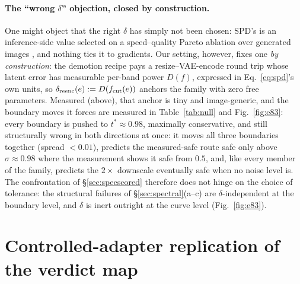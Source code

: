 \paragraph{The ``wrong $\delta$'' objection, closed by construction.}
One might object that the right $\delta$ has simply not been chosen:
SPD's is an inference-side value selected on a speed--quality Pareto
ablation over generated images \citep{xiao2026spd}, and nothing ties it
to gradients. Our setting, however, fixes one \emph{by construction}:
the demotion recipe pays a resize--VAE-encode round trip whose latent
error has measurable per-band power $D(f)$, expressed in
Eq.~\ref{eq:spd}'s own units, so $\delta_{\mathrm{reenc}}(e) :=
D(f_{\mathrm{cut}}(e))$ anchors the family with zero free parameters.
Measured (above), that anchor is tiny and image-generic, and the
boundary moves it forces are measured in Table~\ref{tab:null} and
Fig.~\ref{fig:e83}: every boundary is pushed to $t^{*} \approx 0.98$,
maximally conservative, and still structurally wrong in both
directions at once: it moves all three boundaries together (spread
$< 0.01$), predicts the measured-safe route safe only above
$\sigma \approx 0.98$ where the measurement shows it safe from $0.5$,
and, like every member of the family, predicts the $2\times$ downscale
eventually safe when no noise level is. The confrontation of
\S\ref{sec:specscored} therefore does not hinge on the choice of
tolerance: the structural failures of \S\ref{sec:spectral}(a--c) are
$\delta$-independent at the boundary level, and $\delta$ is inert
outright at the curve level (Fig.~\ref{fig:e83}).

\section{Controlled-adapter replication of the verdict map}
\label{app:e7}

